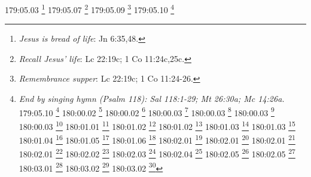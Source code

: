 {{{{{{{{{{{{{{{{{{{{{{{{{{{{{{{{{{{{{{{{{{{{{{{{{{{{{{{{{{{{{{{{{{{{{{{{{{179:05.03 \footnote{\textit{Jesus is bread of life}: Jn 6:35,48.}
179:05.07 \footnote{\textit{Recall Jesus' life}: Lc 22:19c; 1 Co 11:24c,25c.}
179:05.09 \footnote{\textit{Remembrance supper}: Lc 22:19c; 1 Co 11:24-26.}
179:05.10 \footnote{\textit{End by singing hymn (Psalm 118): Sal 118:1-29; Mt 26:30a; Mc 14:26a.}
179:05.10 \footnote{\textit{Ended by singing hymn}: Sal 118:1-29.}
180:00.02 \footnote{\textit{Changing earlier instructions}: Lc 10:4.}
180:00.02 \footnote{\textit{Make preparations for work}: Lc 22:35-36.}
180:00.03 \footnote{\textit{Father & Son glorified}: Jn 13:31-32; Jn 17:1,4.}
180:00.03 \footnote{\textit{I go, you cannot find me}: Jn 13:33.}
180:00.03 \footnote{\textit{You can follow later}: Jn 13:36.}
180:00.03 \footnote{\textit{You cannot come now}: Jn 7:33-34; Jn 8:21.}
180:01.01 \footnote{\textit{The new commandment}: Jn 13:34-35; Jn 15:12,17.}
180:01.02 \footnote{\textit{Jesus' death a supreme joy}: Heb 12:2.}
180:01.02 \footnote{\textit{Places no burden, brings new joy}: Jn 15:11.}
180:01.03 \footnote{\textit{Love one another as I love you}: Jn 13:34-35; Jn 15:12,17.}
180:01.03 \footnote{\textit{No greater love}: Jn 15:12-15.}
180:01.04 \footnote{\textit{I chose you, ordained you}: Jn 15:16-17.}
180:01.05 \footnote{\textit{Share joy, share love}: Jn 14:23.}
180:01.06 \footnote{\textit{Believers are sons of God}: 1 Cr 22:10; Sal 2:7; Is 56:5; Mt 5:9,16,16,45; Lc 20:36; Jn 1:12-13; Jn 11:52; Jn 20:17b; Hch 17:28-29; Ro 8:14-17,19,21; Ro 9:26; 2 Co 6:18; Gl 3:26; Gl 4:5-7; Ef 1:5; Flp 2:15; Heb 12:5-8; 1 Jn 3:1-2,10; 1 Jn 5:2; Ap 21:7; 2 Sam 7:14.}
180:02.01 \footnote{\textit{Disciples yield fruit}: Jn 15:7-9.}
180:02.01 \footnote{\textit{If ask anything my spirit wills}: Jn 14:13-14.}
180:02.01 \footnote{\textit{Know my disciples by your love}: Jn 13:35.}
180:02.01 \footnote{\textit{True vine & branches}: Jn 15:1-5.}
180:02.02 \footnote{\textit{Jesus loves you}: Jn 15:9-10.}
180:02.03 \footnote{\textit{Stem or branch of vine}: Is 4:2; Is 11:1; Jer 23:5-6; Jer 33:15; Dn 11:7; Zac 3:8; Zac 6:12.}
180:02.04 \footnote{\textit{Error regarding "prayer": Jn 14:13-14; Jn 15:7,16b.}
180:02.05 \footnote{\textit{Branch exists for fruit}: Jn 15:1-5.}
180:02.05 \footnote{\textit{Fruit of spirit}: love}: Jn 15:8-9,12.}
180:02.05 \footnote{\textit{Fruit of the spirit}: Gl 5:22-23; Ef 5:9.}
180:02.05 \footnote{\textit{Love as Jesus loved}: Jn 13:34-35; Jn 15:12.}
180:03.01 \footnote{\textit{If world hates, persecutes}: Jn 15:18-21.}
180:03.02 \footnote{\textit{Ignorance no excuse}: Jn 15:22-25.}
180:03.02 \footnote{\textit{They hated without cause}: Sal 35:19; Sal 69:4.}
}}}}}}}}}}}}}}}}}}}}}}}}}}}}}}}}}}}}}}}}}}}}}}}}}}}}}}}}}}}}}}}}}}}}}}}}}}}
